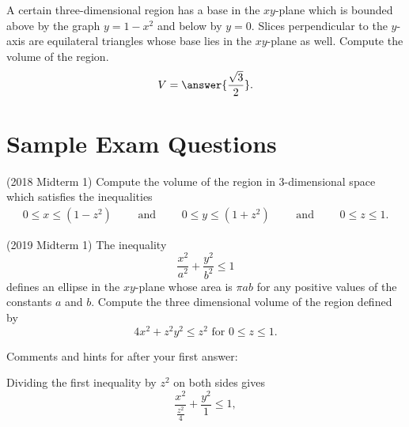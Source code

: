 \documentclass{ximera}
\begin{document}
\begin{exercise}
A certain three-dimensional region has a base in the $xy$-plane which is bounded above by the graph $y = 1-x^2$ and below by $y=0$. Slices perpendicular to the $y$-axis are equilateral triangles whose base lies in the $xy$-plane as well. Compute the volume of the region.
\[ V = \answer{\frac{\sqrt{3}}{2}}. \]
\end{exercise}

\section*{Sample Exam Questions}

\begin{question}(2018 Midterm 1)
Compute the volume of the region in 3-dimensional space which satisfies the inequalities
\begin{align*} 
0 \leq   x \leq (1 - z^2) \qquad \mbox{ and } \qquad
0 \leq  y \leq (1 + z^2) \qquad \mbox{ and } \qquad 
0 \leq z \leq 1.
\end{align*}
\vspace{-12pt}
\begin{multipleChoice}
\end{multipleChoice}
\end{question}

\begin{question}(2019 Midterm 1)
The inequality 
\[ \frac{x^2}{a^2} + \frac{y^2}{b^2} \leq 1 \]
defines an ellipse in the $xy$-plane whose area is $\pi a b$ for any positive values of the constants $a$ and $b$.  Compute the three dimensional volume of the region defined by
\[ 4 x^2 + z^2 y^2 \leq z^2 \mbox{ for } 0 \leq z \leq 1. \]
\begin{multipleChoice}
\choice{$4 \pi$}
\choice{$\displaystyle {\pi}$}
\end{multipleChoice}
Comments and hints for after your first answer:
\begin{feedback}
Dividing the first inequality by $z^2$ on both sides gives
\[ \frac{x^2}{\frac{z^2}{4}} + \frac{y^2}{1} \leq 1, \]
\end{feedback}
\end{question}
\end{document}
